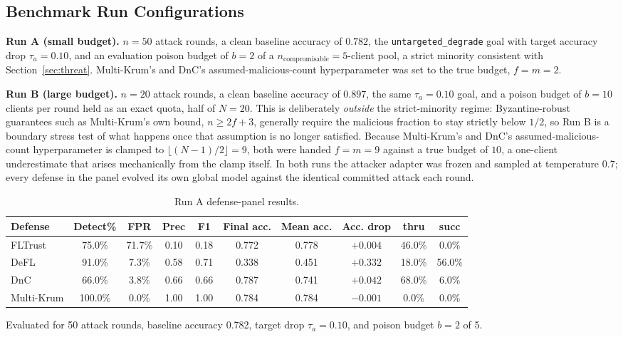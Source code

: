 \documentclass[conference,9pt]{IEEEtran}
\begin{document}
\subsection{Benchmark Run Configurations}
\label{sec:run-config}
\textbf{Run A (small budget).} $n=50$ attack rounds, a clean baseline accuracy of $0.782$, the \texttt{untargeted\_degrade} goal with target accuracy drop $\tau_a = 0.10$, and an evaluation poison budget of $b=2$ of a $n_{\mathrm{compromisable}}=5$-client pool, a strict minority consistent with Section~\ref{sec:threat}. Multi-Krum's and DnC's assumed-malicious-count hyperparameter was set to the true budget, $f=m=2$.

\textbf{Run B (large budget).} $n=20$ attack rounds, a clean baseline accuracy of $0.897$, the same $\tau_a=0.10$ goal, and a poison budget of $b=10$ clients per round held as an exact quota, half of $N=20$. This is deliberately \emph{outside} the strict-minority regime: Byzantine-robust guarantees such as Multi-Krum's own bound, $n \geq 2f+3$, generally require the malicious fraction to stay strictly below $1/2$, so Run B is a boundary stress test of what happens once that assumption is no longer satisfied. Because Multi-Krum's and DnC's assumed-malicious-count hyperparameter is clamped to $\lfloor (N-1)/2\rfloor = 9$, both were handed $f=m=9$ against a true budget of $10$, a one-client underestimate that arises mechanically from the clamp itself. In both runs the attacker adapter was frozen and sampled at temperature 0.7; every defense in the panel evolved its own global model against the identical committed attack each round.

\begin{table}[t]
\caption{Run A defense-panel results.}
\label{tab:results}
\centering
\small
\begin{tabular}{@{}lccccccccc@{}}
\toprule
\textbf{Defense} & \textbf{Detect\%} & \textbf{FPR} & \textbf{Prec} & \textbf{F1} & \textbf{Final acc.} & \textbf{Mean acc.} & \textbf{Acc. drop} & \textbf{thru} & \textbf{succ} \\
\midrule
FLTrust & 75.0\% & 71.7\% & 0.10 & 0.18 & 0.772 & 0.778 & $+0.004$ & 46.0\% & 0.0\% \\
DeFL & 91.0\% & 7.3\% & 0.58 & 0.71 & 0.338 & 0.451 & $+0.332$ & 18.0\% & 56.0\% \\
DnC & 66.0\% & 3.8\% & 0.66 & 0.66 & 0.787 & 0.741 & $+0.042$ & 68.0\% & 6.0\% \\
Multi-Krum & 100.0\% & 0.0\% & 1.00 & 1.00 & 0.784 & 0.784 & $-0.001$ & 0.0\% & 0.0\% \\
\bottomrule
\end{tabular}
\vspace{1mm}

\small Evaluated for 50 attack rounds, baseline accuracy 0.782, target drop $\tau_a=0.10$, and poison budget $b=2$ of 5.
\end{table}
\end{document}
